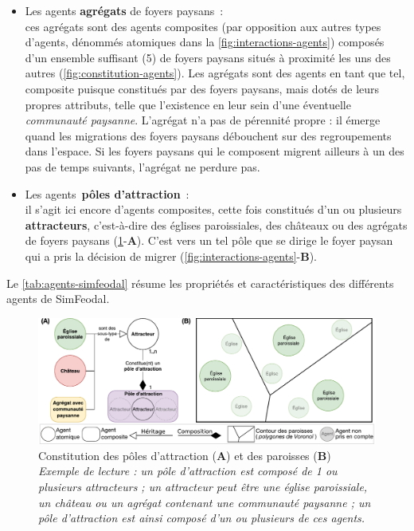 \begin{itemize}
	\item Les agents \og \textbf{agrégats} de foyers paysans\fg{} : \\
	ces agrégats sont des agents \og composites\fg{} (par opposition aux autres types d'agents, dénommés \og atomiques\fg{} dans la \cref{fig:interactions-agents}) composés d'un ensemble suffisant (5) de foyers paysans situés à proximité les uns des autres (\cref{fig:constitution-agents}).
	Les agrégats sont des agents en tant que tel, composite puisque constitués par des foyers paysans, mais dotés de leurs propres attributs, telle que l'existence en leur sein d'une éventuelle \textit{communauté paysanne}.
	L'agrégat n'a pas de pérennité propre : il émerge quand les migrations des foyers paysans débouchent sur des regroupements dans l'espace.
	Si les foyers paysans qui le composent migrent ailleurs à un des pas de temps suivants, l'agrégat ne perdure pas.
	
	\item Les agents \og \textbf{pôles d'attraction}\fg{} : \\
	il s'agit ici encore d'agents composites, cette fois constitués d'un ou plusieurs \textbf{attracteurs}, c'est-à-dire des églises paroissiales, des châteaux ou des agrégats de foyers paysans (\cref{fig:constitution-poles-paroisses}-\textbf{A}).
	C'est vers un tel pôle que se dirige le foyer paysan qui a pris la décision de migrer (\cref{fig:interactions-agents}-\textbf{B}).
\end{itemize}

Le \cref{tab:agents-simfeodal} résume les propriétés et caractéristiques des différents agents de SimFeodal.

	\begin{figure}[H]
	\centering
	\includegraphics[width=\linewidth]{img/agents_paroisses_poles.pdf}
	\caption{Constitution des pôles d'attraction (\textbf{A}) et des paroisses (\textbf{B})\\
		\textit{Exemple de lecture : un pôle d'attraction est composé de 1 ou plusieurs attracteurs ;
			un attracteur peut être une église paroissiale, un château ou un agrégat contenant une communauté paysanne ;
			un pôle d'attraction est ainsi composé d'un ou plusieurs de ces agents.}}
	\label{fig:constitution-poles-paroisses}
\end{figure}




